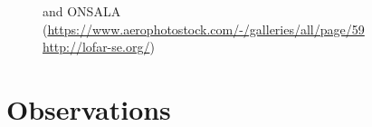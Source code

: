 \begin{figure}[H]
    \centering
    \qquad
    \caption{ \citet{gunst2010lofar} and ONSALA (\url{https://www.aerophotostock.com/-/galleries/all/page/59} \url{http://lofar-se.org/})}%
    \label{fig:example}%
\end{figure}











\section{Observations}


